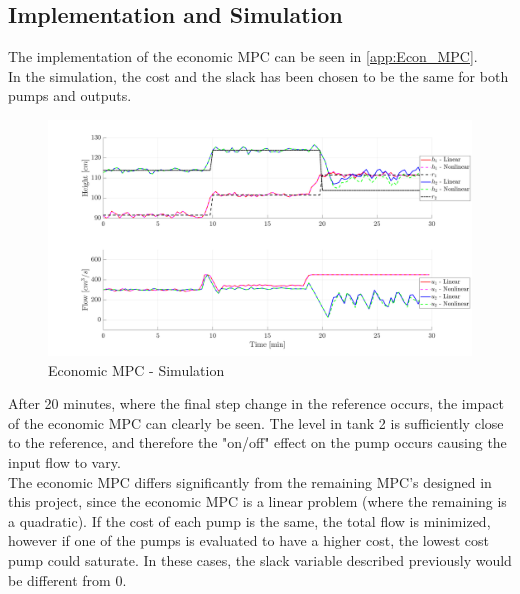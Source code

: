 \subsection{Implementation and Simulation}
The implementation of the economic MPC can be seen in \cref{app:Econ_MPC}.\\
In the simulation, the cost and the slack has been chosen to be the same for both pumps and outputs.
\begin{figure}[H]
    \centering
    \includegraphics[width=1\textwidth]{Figures/Pr12.3_Econ_MPC.png}
    \caption{Economic MPC - Simulation}
\end{figure}
After 20 minutes, where the final step change in the reference occurs, the impact of the economic MPC can clearly be seen. The level in tank 2 is sufficiently close to the reference, and therefore the "on/off" effect on the pump occurs causing the input flow to vary.\\
The economic MPC differs significantly from the remaining MPC's designed in this project, since the economic MPC is a linear problem (where the remaining is a quadratic). If the cost of each pump is the same, the total flow is minimized, however if one of the pumps is evaluated to have a higher cost, the lowest cost pump could saturate. In these cases, the slack variable described previously would be different from 0.